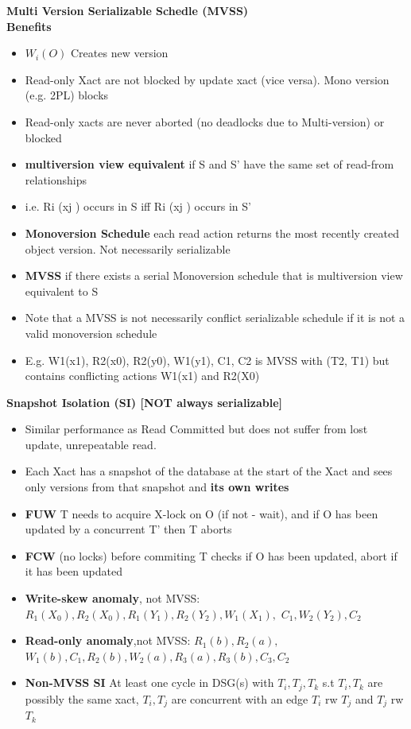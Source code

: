 \documentclass[10pt, landscape]{article}
\begin{document}
\begin{multicols}{4}
\textbf{Multi Version Serializable Schedle (MVSS)} \\
\textbf{Benefits} \\
\begin{itemize}
  \item $W_i(O)$ Creates new version
  \item Read-only Xact are not blocked by update xact (vice versa). Mono version (e.g. 2PL) blocks
  \item Read-only xacts are never aborted (no deadlocks due to Multi-version) or blocked
\end{itemize}

\begin{itemize}
  \item \textbf{multiversion view equivalent} if S and S' have the same set of read-from relationships
  \item i.e. Ri (xj ) occurs in S iff Ri (xj ) occurs in S'
  \item \textbf{Monoversion Schedule} each read action returns the most recently created object version. Not necessarily serializable
  \item \textbf{MVSS} if there exists a serial Monoversion schedule that is multiversion view equivalent to S
  \item Note that a MVSS is not necessarily conflict serializable schedule if it is not a valid monoversion schedule
  \item E.g. W1(x1), R2(x0), R2(y0), W1(y1), C1, C2 is MVSS with (T2, T1) but contains conflicting actions W1(x1) and R2(X0)
\end{itemize}

\textbf{Snapshot Isolation (SI) [NOT always serializable]} \\
\begin{itemize}
  \item Similar performance as Read Committed but does not suffer from lost update, unrepeatable read.
  \item Each Xact has a snapshot of the database at the start of the Xact and sees only versions from that snapshot and \textbf{its own writes}
  \item \textbf{FUW} T needs to acquire X-lock on O (if not - wait), and if O has been updated by a concurrent T' then T aborts
  \item \textbf{FCW} (no locks) before commiting T checks if O has been updated, abort if it has been updated
  \item \textbf{Write-skew anomaly}, not MVSS: $R_1(X_0), R_2(X_0), R_1(Y_1), R_2(Y_2), W_1(X_1),$ $ C_1, W_2(Y_2), C_2$
  \item \textbf{Read-only anomaly},not MVSS: $R_1(b), R_2(a),$\\$ W_1(b), C_1, R_2(b), W_2(a),R_3(a), R_3(b), C_3, C_2$
  \item \textbf{Non-MVSS SI} At least one cycle in DSG(s) with $T_i, T_j, T_k$ s.t $T_i,T_k$ are possibly the same xact, $T_i, T_j$ are concurrent with an edge $T_i$ rw $T_j$ and $T_j$ rw $T_k$
\end{itemize}


\end{multicols}
\end{document}
